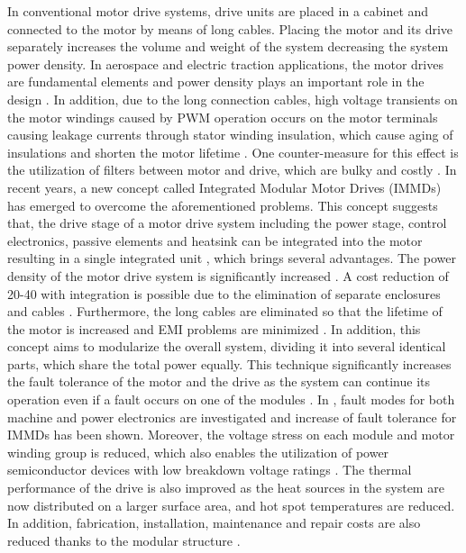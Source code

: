 \documentclass[conference,a4paper,twocolumn]{IEEEtran}
\begin{document}
In conventional motor drive systems, drive units are placed in a cabinet and connected to the motor by means of long cables. Placing the motor and its drive separately increases the volume and weight of the system decreasing the system power density. In aerospace and electric traction applications, the motor drives are fundamental elements and power density plays an important role in the design \cite{LoCalzo2016,Wolmarans2008,Hennen2012,Lambert2015a,Lambert2015b,Galassini2015}. In addition, due to the long connection cables, high voltage transients on the motor windings caused by PWM operation occurs on the motor terminals causing leakage currents through stator winding insulation, which cause aging of insulations and shorten the motor lifetime \cite{Wang2013,Jahns2014}. One counter-measure for this effect is the utilization of filters between motor and drive, which are bulky and costly \cite{LoCalzo2016}.
In recent years, a new concept called Integrated Modular Motor Drives (IMMDs) has emerged to overcome the aforementioned problems. This concept suggests that, the drive stage of a motor drive system including the power stage, control electronics, passive elements and heatsink can be integrated into the motor resulting in a single integrated unit \cite{LoCalzo2016}, which brings several advantages. The power density of the motor drive system is significantly increased \cite{Lambert2015a,Wang2013}. A cost reduction of 20-40  with integration is possible due to the elimination of separate enclosures and cables \cite{LoCalzo2016}. Furthermore, the long cables are eliminated so that the lifetime of the motor is increased and EMI problems are minimized \cite{Wolmarans2008}. In addition, this concept aims to modularize the overall system, dividing it into several identical parts, which share the total power equally. This technique significantly increases the fault tolerance of the motor and the drive as the system can continue its operation even if a fault occurs on one of the modules \cite{Hennen2012,Galassini2015,Wang2013}. In \cite{Wolmarans2008}, fault modes for both machine and power electronics are investigated and increase of fault tolerance for IMMDs has been shown. Moreover, the voltage stress on each module and motor winding group is reduced, which also enables the utilization of power semiconductor devices with low breakdown voltage ratings \cite{Wang2014,Wang2015}. The thermal performance of the drive is also improved as the heat sources in the system are now distributed on a larger surface area, and hot spot temperatures are reduced. In addition, fabrication, installation, maintenance and repair costs are also reduced thanks to the modular structure \cite{LoCalzo2016,Hennen2012,Lambert2015b,Jahns2014}.
\end{document}
